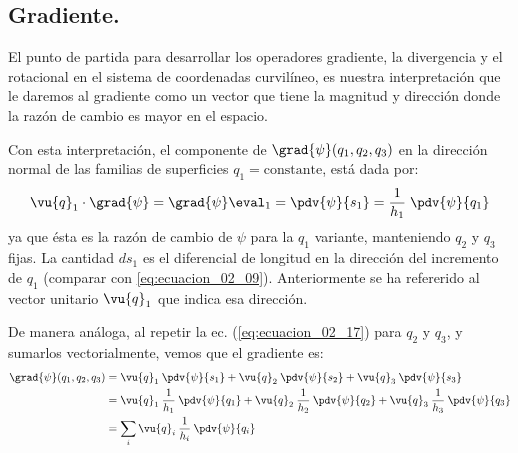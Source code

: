 \subsection{Gradiente.} 
El punto de partida para desarrollar los operadores gradiente, la divergencia y el rotacional en el sistema de coordenadas curvilíneo, es nuestra interpretación que le daremos al gradiente como un vector que tiene la magnitud y dirección donde la razón de cambio es mayor en el espacio.
\par
 Con esta interpretación, el componente de $\grad{\psi}(q_{1}, q_{2}, q_{3})$ en la dirección normal de las familias de superficies $q_{1} = \text{constante}$, está dada por:
\begin{equation}
\vu{q}_{1} \cdot \grad{\psi} = \grad{\psi} \eval_{1} = \pdv{\psi}{s_{1}} = \dfrac{1}{h_{1}} \; \pdv{\psi}{q_{1}}
\label{eq:ecuacion_02_17}
\end{equation}
ya que ésta es la razón de cambio de $\psi$ para la $q_{1}$ variante, manteniendo $q_{2}$ y $q_{3}$ fijas. La cantidad $ds_{1}$ es el diferencial de longitud en la dirección del incremento de $q_{1}$ (comparar con \ref{eq:ecuacion_02_09}). Anteriormente se ha refererido al vector unitario $\vu{q}_{1}$ que indica esa dirección.
\par
De manera análoga, al repetir la ec. (\ref{eq:ecuacion_02_17}) para $q_{2}$ y $q_{3}$, y sumarlos vectorialmente, vemos que el gradiente es:
\begin{align}
\begin{aligned}
\grad{\psi} (q_{1},q_{2},q_{3}) &= \vu{q}_{1} \: \pdv{\psi}{s_{1}} + \vu{q}_{2} \: \pdv{\psi}{s_{2}} + \vu{q}_{3} \: \pdv{\psi}{s_{3}} \\
&= \vu{q}_{1} \: \dfrac{1}{h_{1}} \: \pdv{\psi}{q_{1}} + \vu{q}_{2}\: \dfrac{1}{h_{2}} \: \pdv{\psi}{q_{2}} + \vu{q}_{3} \: \dfrac{1}{h_{3}} \: \pdv{\psi}{q_{3}} \\
&= \sum_{i} \vu{q}_{i} \: \dfrac{1}{h_{i}} \: \pdv{\psi}{q_{i}}
\label{eq:ecuacion_02_18}
\end{aligned}
\end{align}
